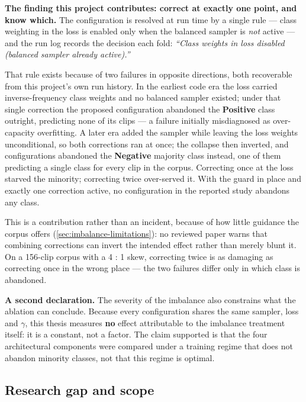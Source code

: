 \textbf{The finding this project contributes: correct at exactly one point, and know which.} The configuration is resolved at run time by a single rule --- class weighting in the loss is enabled only when the balanced sampler is \textit{not} active --- and the run log records the decision each fold: \textit{``Class weights in loss disabled (balanced sampler already active).''}

That rule exists because of two failures in opposite directions, both recoverable from this project's own run history. In the earliest code era the loss carried inverse-frequency class weights and no balanced sampler existed; under that single correction the proposed configuration abandoned the \textbf{Positive} class outright, predicting none of its clips --- a failure initially misdiagnosed as over-capacity overfitting. A later era added the sampler while leaving the loss weights unconditional, so both corrections ran at once; the collapse then inverted, and configurations abandoned the \textbf{Negative} majority class instead, one of them predicting a single class for every clip in the corpus. Correcting once at the loss starved the minority; correcting twice over-served it. With the guard in place and exactly one correction active, no configuration in the reported study abandons any class.

This is a contribution rather than an incident, because of how little guidance the corpus offers (\autoref{sec:imbalance-limitations}): no reviewed paper warns that combining corrections can invert the intended effect rather than merely blunt it. On a 156-clip corpus with a 4 : 1 skew, correcting twice is as damaging as correcting once in the wrong place --- the two failures differ only in which class is abandoned.

\textbf{A second declaration.} The severity of the imbalance also constrains what the ablation can conclude. Because every configuration shares the same sampler, loss and $\gamma$, this thesis measures \textbf{no} effect attributable to the imbalance treatment itself: it is a constant, not a factor. The claim supported is that the four architectural components were compared under a training regime that does not abandon minority classes, not that this regime is optimal.

\subsection{Research gap and scope}
\label{sec:imbalance-gap}

